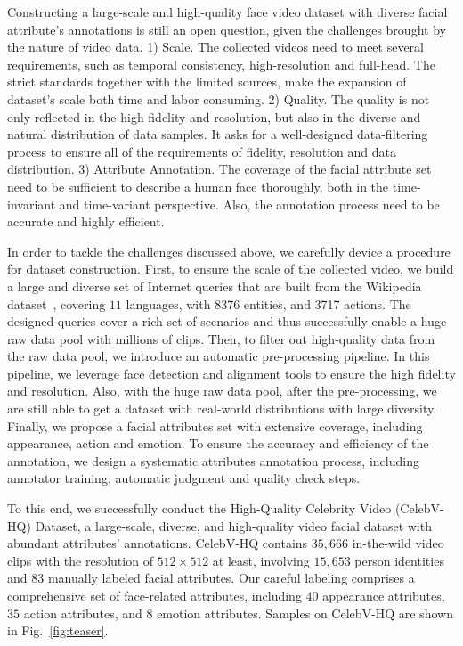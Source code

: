 \documentclass[runningheads]{llncs}
\begin{document}
Constructing a large-scale and high-quality face video dataset with diverse facial attribute's annotations is still an open question, given the challenges brought by the nature of video data.
1) Scale. The collected videos need to meet several requirements, such as temporal consistency, high-resolution and full-head. The strict standards together with the limited sources, make the expansion of dataset's scale both time and labor consuming.
2) Quality. The quality is not only reflected in the high fidelity and resolution, but also in the diverse and natural distribution of data samples. It asks for a well-designed data-filtering process to ensure all of the requirements of fidelity, resolution and data distribution.
3) Attribute Annotation. The coverage of the facial attribute set need to be sufficient to  describe a human face thoroughly, both in the time-invariant and time-variant perspective. Also, the annotation process need to be accurate and highly efficient.





In order to tackle the challenges discussed above, we carefully device a procedure for dataset construction.
First, to ensure the scale of the collected video, we build a large and diverse set of Internet queries that are built from the Wikipedia dataset~\cite{wikidataset}, covering $11$ languages, with 8376 entities, and 3717 actions. The designed queries cover a rich set of scenarios and thus successfully enable a huge raw data pool with millions of clips.
Then, to filter out high-quality data from the raw data pool, we introduce an automatic pre-processing pipeline. In this pipeline, we leverage face detection and alignment tools to ensure the high fidelity and resolution. Also, with the huge raw data pool, after the pre-processing, we are still able to get a dataset with real-world distributions with large diversity.
Finally, we propose a facial attributes set with extensive coverage, including appearance, action and emotion.
To ensure the accuracy and efficiency of the annotation, we design a systematic attributes annotation process, including annotator training, automatic judgment and quality check steps.

To this end, we successfully conduct the High-Quality Celebrity Video (CelebV-HQ) Dataset, a large-scale, diverse, and high-quality video facial dataset with abundant attributes' annotations.
CelebV-HQ contains $35,666$ in-the-wild video clips with the resolution of $512\times512$ at least, involving $15,653$ person identities and $83$ manually labeled facial attributes.
Our careful labeling comprises a comprehensive set of face-related attributes, including $40$ appearance attributes, $35$ action attributes, and $8$ emotion attributes. Samples on CelebV-HQ are shown in Fig.~\ref{fig:teaser}.
\end{document}
